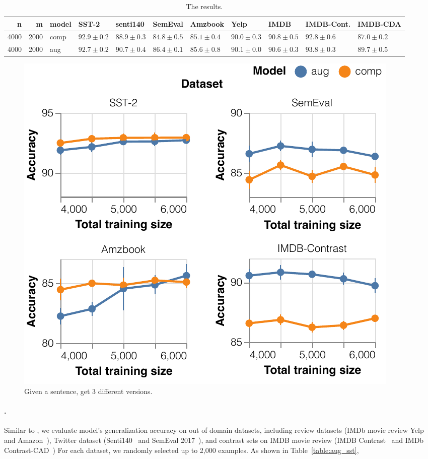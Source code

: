 \begin{table}
\small
\centering
\setlength{\tabcolsep}{4pt}
\begin{tabular}{rrlllllllll}
\toprule
    n &     m &    model &          SST-2 &       senti140 &        SemEval &        Amzbook &           Yelp &           IMDB &     IMDB-Cont. &       IMDB-CDA \\
\midrule
 4000 &  2000 &     comp &  $92.9\pm 0.2$ &  $88.9\pm 0.3$ &  $84.8\pm 0.5$ &  $85.1\pm 0.4$ &  $90.0\pm 0.3$ &  $90.8\pm 0.5$ &  $92.8\pm 0.6$ &  $87.0\pm 0.2$ \\
 4000 &  2000 &  aug	 &  $92.7\pm 0.2$ &  $90.7\pm 0.4$ &  $86.4\pm 0.1$ &  $85.6\pm 0.8$ &  $90.1\pm 0.0$ &  $90.6\pm 0.3$ &  $93.8\pm 0.3$ &  $89.7\pm 0.5$ \\
\bottomrule
\end{tabular}

\caption{The \sst results. }
\label{table:sst_result}
\end{table}

\begin{figure}[t]
\centering
\includegraphics[width=1\columnwidth]{figures/sst_trend}
\vspace{-15pt}
\caption{Given a sentence, get 3 different versions.}
\vspace{-10pt}
\label{fig:sst_trend}
\end{figure}


\paragraph{\sst.}
 Similar to \citet{kaushik2019learning}, we evaluate \sst model's generalization accuracy on out of domain datasets, including review datasets (IMDb movie review Yelp~\cite{} and Amazon~\cite{}), Twitter dataset (Senti140~\cite{} and SemEval 2017~\cite{}), and contrast sets on IMDB movie review (IMDB Contrast~\cite{} and IMDb Contrast-CAD~\cite{})  
For each dataset, we randomly selected up to 2,000 examples.
As shown in Table~\ref{table:aug_sst}, 


